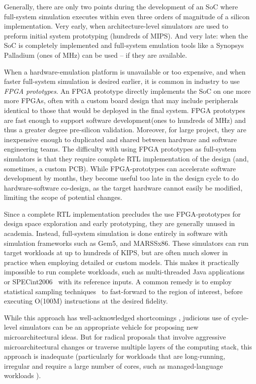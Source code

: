 Generally, there are only two points during the development of an SoC where
full-system simulation executes within even three orders of magnitude of a
silicon implementation. Very early, when architecture-level simulators are used
to preform initial system prototyping (hundreds of MIPS). And very late: when
the SoC is completely implemented and full-system emulation tools like a
Synopsys Palladium\cite{palladium} (ones of MHz) can be used -- if they are
available.

When a hardware-emulation platform is unavailable or too expensive, and when
faster full-system simulation is desired earlier, it is common in industry to
use \emph{FPGA prototypes}. An FPGA prototype directly implements the SoC on
one more more FPGAs, often with a custom board design that may include
peripherals identical to those that would be deployed in the final system. FPGA
prototypes are fast enough to support software development(ones to hundreds of
MHz) and thus a greater degree pre-silicon validation. Moreover, for large
project, they are inexpensive enough to duplicated and shared between hardware
and software engineering teams.  The difficulty with using FPGA prototypes as
full-system simulators is that they require complete RTL implementation of the
design (and, sometimes, a custom PCB). While FPGA-prototypes can accelerate
software development by months, they become useful too late in the design cycle
to do hardware-software co-design, as the target hardware cannot easily be
modified, limiting the scope of potential changes.

Since a complete RTL implementation precludes the use FPGA-prototypes for
design space exploration and early prototyping, they are generally unused in
academia. Instead, full-system simulation is done entirely in software with
simulation frameworks such as Gem5\cite{gem5}, and MARSSx86\cite{marssx86}.
These simulators can run target workloads at up to hundreds of KIPS, but are
often much slower in practice when employing detailed or custom models. This
makes it practically impossible to run complete workloads, such as
multi-threaded Java applications or SPECint2006~\cite{spec} with its reference
inputs. A common remedy is to employ statistical sampling
techniques~\cite{smarts} to fast-forward to the region of interest, before
executing O(100M) instructions at the desired fidelity.

While this approach has well-acknowledged shortcomings \cite{gem5error},
judicious use of cycle-level simulators can be an appropriate vehicle for
proposing new microarchitectural ideas. But for radical proposals that involve
aggressive microarchitectural changes or traverse multiple layers of the
computing stack, this approach is inadequate (particularly for workloads that
are long-running, irregular and require a large number of cores, such as
managed-language workloads \cite{MicroSimPanel}).

